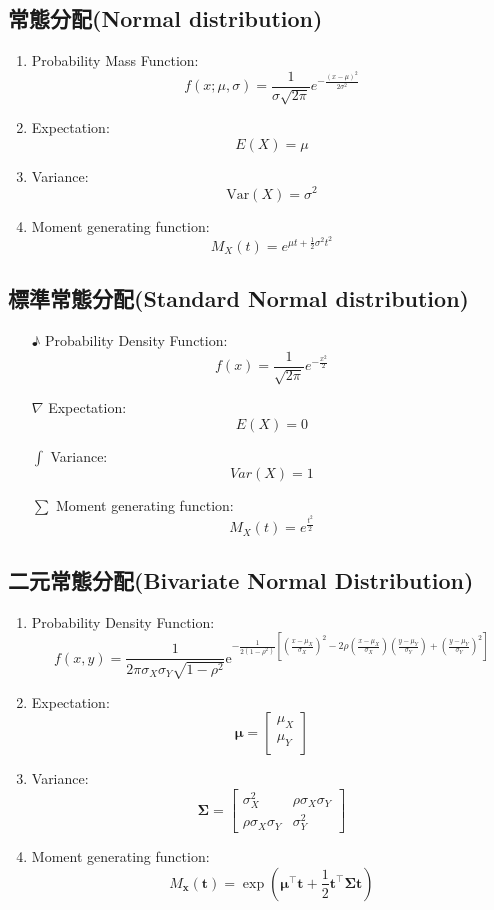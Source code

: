 \subsection{常態分配(Normal distribution)}
\begin{enumerate}[→]
\item Probability Mass Function:$$f(x;\mu,\sigma)=\frac{1}{\sigma\sqrt{2\pi}} e^{-\frac{(x-\mu)^2}{2\sigma^2}}$$
\item Expectation:$$E(X)=\mu$$
\item Variance:$$\text{Var}(X)=\sigma^2$$
\item Moment generating function:$$M_X(t)=e^{\mu t +\frac{1}{2}\sigma^2t^2}$$
\end{enumerate}
\subsection{標準常態分配(Standard Normal distribution)}
\begin{enumerate}
\item[♪] Probability Density Function:$$f(x)=\frac{1}{\sqrt{2\pi}} e^{-\frac{x^2}{2}}$$
\item[$\nabla$] Expectation:$$E(X)=0$$
\item[$\int$] Variance:$$Var(X)=1$$
\item[$\sum$] Moment generating function:$$M_X(t)=e^{\frac{t^2}{2}}$$
\end{enumerate}
\subsection{二元常態分配(Bivariate Normal Distribution)}
\begin{enumerate}
\item Probability Density Function:$${\displaystyle f(x,y)={\frac {1}{2\pi \sigma _{X}\sigma _{Y}{\sqrt {1-\rho ^{2}}}}}\mathrm {e} ^{-{\frac {1}{2(1-\rho ^{2})}}\left[({\frac {x-\mu _{X}}{\sigma _{X}}})^{2}-2\rho ({\frac {x-\mu _{X}}{\sigma _{X}}})({\frac {y-\mu _{Y}}{\sigma _{Y}}})+({\frac {y-\mu _{Y}}{\sigma _{Y}}})^{2}\right]}}$$
\item Expectation:$$\boldsymbol{\mu} = \begin{bmatrix}
   \mu_X \\
   \mu_Y \\
\end{bmatrix}$$
\item Variance:$$\boldsymbol{\Sigma} =\begin{bmatrix}
    \sigma_X^2&\rho\sigma_X\sigma_Y\\
    \rho\sigma_X\sigma_Y&\sigma_Y^2
\end{bmatrix}$$
\item Moment generating function:$$M_{\mathbf{x}}(\mathbf{t})=\exp\left(\boldsymbol{\mu}^\top \mathbf{t}+\frac{1}{2}\mathbf{t}^\top\boldsymbol{\Sigma} \mathbf{t}\right)$$
\end{enumerate}
